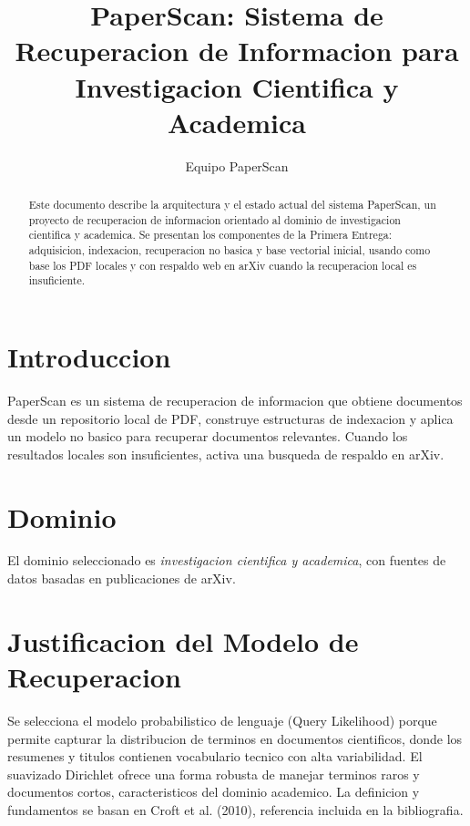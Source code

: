 \documentclass[runningheads]{llncs}
\begin{document}
\title{PaperScan: Sistema de Recuperacion de Informacion para Investigacion Cientifica y Academica}
\author{Equipo PaperScan}
\maketitle

\begin{abstract}
Este documento describe la arquitectura y el estado actual del sistema PaperScan,
un proyecto de recuperacion de informacion orientado al dominio de investigacion
cientifica y academica. Se presentan los componentes de la Primera Entrega:
adquisicion, indexacion, recuperacion no basica y base vectorial inicial, usando
como base los PDF locales y con respaldo web en arXiv cuando la recuperacion local
es insuficiente.
\end{abstract}

\section{Introduccion}
PaperScan es un sistema de recuperacion de informacion que obtiene documentos
desde un repositorio local de PDF, construye estructuras de indexacion y aplica
un modelo no basico para recuperar documentos relevantes. Cuando los resultados
locales son insuficientes, activa una busqueda de respaldo en arXiv.

\section{Dominio}
El dominio seleccionado es \textit{investigacion cientifica y academica}, con
fuentes de datos basadas en publicaciones de arXiv.

\section{Justificacion del Modelo de Recuperacion}
Se selecciona el modelo probabilistico de lenguaje (Query Likelihood) porque
permite capturar la distribucion de terminos en documentos cientificos, donde
los resumenes y titulos contienen vocabulario tecnico con alta variabilidad.
El suavizado Dirichlet ofrece una forma robusta de manejar terminos raros y
documentos cortos, caracteristicos del dominio academico. La definicion y
fundamentos se basan en Croft et al. (2010), referencia incluida en la
bibliografia.
\end{document}
